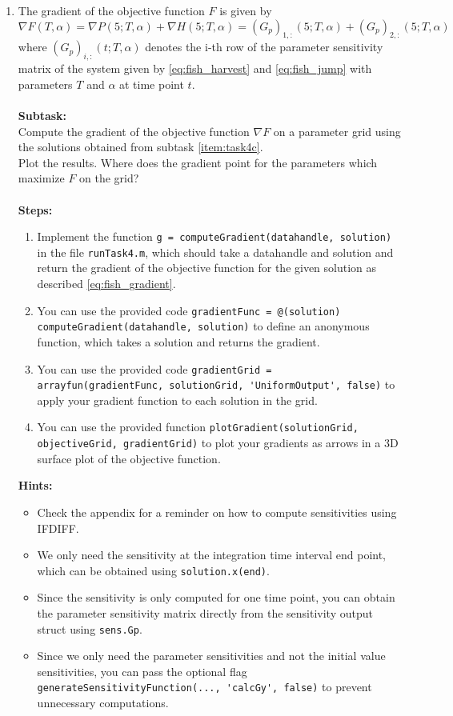 \begin{enumerate}[label=\alph*)]
    \item The gradient of the objective function $F$ is given by
    \begin{equation}\label{eq:fish_gradient}
       \nabla F(T, \alpha) = \nabla P(5; T, \alpha) + \nabla H(5; T, \alpha) = (G_p)_{1,:}(5; T, \alpha) + (G_p)_{2,:}(5; T, \alpha)
    \end{equation}
    where $(G_p)_{i, :}(t; T, \alpha)$ denotes the i-th row of the parameter sensitivity matrix of the system given by \cref{eq:fish_harvest} and \cref{eq:fish_jump} with parameters $T$ and $\alpha$ at time point $t$. \\ \\
    \textbf{Subtask:} \\
    Compute the gradient of the objective function $\nabla F$ on a parameter grid using the solutions obtained from subtask \ref{item:task4c}.\\
    Plot the results. Where does the gradient point for the parameters which maximize $F$ on the grid? \\ \\
    \textbf{Steps:}
    \begin{enumerate}[label=\arabic*.]
       \item Implement the function \lstinline|g = computeGradient(datahandle, solution)| in the file \texttt{runTask4.m}, which should take a datahandle and solution and return the gradient of the objective function for the given solution as described \cref{eq:fish_gradient}.
       \item You can use the provided code \lstinline|gradientFunc = @(solution) computeGradient(datahandle, solution)| to define an anonymous function, which takes a solution and returns the gradient.
       \item You can use the provided code \lstinline|gradientGrid = arrayfun(gradientFunc, solutionGrid, 'UniformOutput', false)| to apply your gradient function to each solution in the grid.
       \item You can use the provided function \lstinline|plotGradient(solutionGrid, objectiveGrid, gradientGrid)| to plot your gradients as arrows in a 3D surface plot of the objective function.
    \end{enumerate}
    \textbf{Hints:}
    \begin{itemize}
       \item Check the appendix for a reminder on how to compute sensitivities using IFDIFF.
       \item We only need the sensitivity at the integration time interval end point, which can be obtained using \lstinline|solution.x(end)|.
       \item Since the sensitivity is only computed for one time point, you can obtain the parameter sensitivity matrix directly from the sensitivity output struct using \lstinline|sens.Gp|.
       \item Since we only need the parameter sensitivities and not the initial value sensitivities, you can pass the optional flag \lstinline|generateSensitivityFunction(..., 'calcGy', false)| to prevent unnecessary computations.
    \end{itemize}


\end{enumerate}
